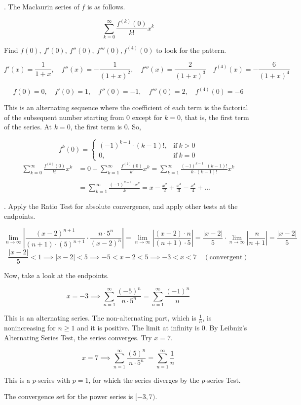 \documentclass{article}
\begin{document}
\newpage

. The Maclaurin series of $f$ is as follows.

\[\sum_{k=0}^{\infty}\frac{f^{(k)}(0)}{k!}x^k\]

\hfill

\noindent Find $f(0),\:f'(0),\:f''(0),\:f'''(0),f^{(4)}(0)$ to look for the pattern.

\[f'(x)=\frac1{1+x},\quad f''(x)=-\frac1{(1+x)^2},\quad f'''(x)=\frac2{(1+x)^3}\quad f^{(4)}(x)=-\frac6{(1+x)^4} \]

\[f(0)=0,\quad f'(0)=1,\quad f''(0)=-1,\quad f'''(0)=2,\quad f^{(4)}(0)=-6\]

\hfill

\noindent This is an alternating sequence where the coefficient of each term is the factorial of the subsequent number starting from $0$ except for $k=0$, that is, the first term of the series. At $k=0$, the first term is $0$. So,

\[f^{k}(0)=\left\{\begin{array}{ll}(-1)^{k-1}\cdot (k-1)!,&\text{if}\: k>0\\0,& \text{if}\:k=0\end{array}\right.\]
\begin{align*}\sum_{k=0}^{\infty}\frac{f^{(k)}(0)}{k!}x^k&=0+\sum_{k=1}^{\infty}\frac{f^{(k)}(0)}{k!}x^k=\sum_{k=1}^{\infty}\frac{(-1)^{k-1}\cdot(k-1)!}{k\cdot(k-1)!}x^k\\\\&=\boxed{\sum_{k=1}^{\infty}\frac{(-1)^{k-1}\cdot x^k}{k}=x-\frac{x^2}2+\frac{x^3}3-\frac{x^4}4+...}\end{align*}

\hfill

. Apply the Ratio Test for absolute convergence, and apply other tests at the endpoints.

\[\lim_{n\to\infty}\left|\frac{(x-2)^{n+1}}{(n+1)\cdot(5)^{n+1}}\cdot\frac{n\cdot5^n}{(x-2)^n}\right|=\lim_{n\to\infty}\left|\frac{\left(x-2\right)\cdot n}{(n+1)\cdot5}\right|=\frac{|x-2|}5\cdot\lim_{n\to\infty}\left|\frac{n}{n+1}\right|=\frac{|x-2|}5\]
\[\frac{|x-2|}5<1\implies |x-2|<5\implies -5<x-2<5\implies -3<x<7 \quad (\text{convergent})\]

\hfill

\noindent Now, take a look at the endpoints.

\[x=-3\implies \sum_{n=1}^{\infty}\frac{(-5)^n}{n\cdot5^n}=\sum_{n=1}^{\infty}\frac{(-1)^n}n\]

\hfill

\noindent This is an alternating series. The non-alternating part, which is $\frac1n$, is nonincreasing for $n\geq1$ and it is positive. The limit at infinity is $0$. By Leibniz's Alternating Series Test, the series converges. Try $x=7$.

\[x=7\implies\sum_{n=1}^{\infty}\frac{(5)^n}{n\cdot5^n}=\sum_{n=1}^{\infty}\frac1n\]

\hfill

\noindent This is a $p$-series with $p=1$, for which the series diverges by the $p$-series Test.

\hfill

\noindent The convergence set for the power series is $\boxed{[-3,7)}$.
\end{document}

